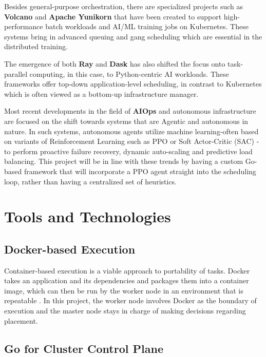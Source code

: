 Besides general-purpose orchestration, there are specialized projects such as \textbf{Volcano} \cite{volcano2025} and \textbf{Apache Yunikorn} \cite{yunikorn2025} that have been created to support high-performance batch workloads and AI/ML training jobs on Kubernetes. These systems bring in advanced queuing and gang scheduling which are essential in the distributed training.

The emergence of both \textbf{Ray} \cite{moritz2018ray} and \textbf{Dask} has also shifted the focus onto task-parallel computing, in this case, to Python-centric AI workloads. These frameworks offer top-down application-level scheduling, in contrast to Kubernetes which is often viewed as a bottom-up infrastructure manager.

Most recent developments in the field of \textbf{AIOps} and autonomous infrastructure are focused on the shift towards systems that are Agentic and autonomous in nature. In such systems, autonomous agents utilize machine learning-often based on variants of Reinforcement Learning such as PPO \cite{schulman2017ppo} or Soft Actor-Critic (SAC) \cite{haarnoja2018sac}-to perform proactive failure recovery, dynamic auto-scaling and predictive load balancing. This project will be in line with these trends by having a custom Go-based framework that will incorporate a PPO agent straight into the scheduling loop, rather than having a centralized set of heuristics.

\section{Tools and Technologies}
\label{section:tools_technologies}

\subsection{Docker-based Execution}

Container-based execution is a viable approach to portability of tasks. Docker takes an application and its dependencies and packages them into a container image, which can then be run by the worker node in an environment that is repeatable \cite{dockerdocs}. In this project, the worker node involves Docker as the boundary of execution and the master node stays in charge of making decisions regarding placement.

\subsection{Go for Cluster Control Plane}

